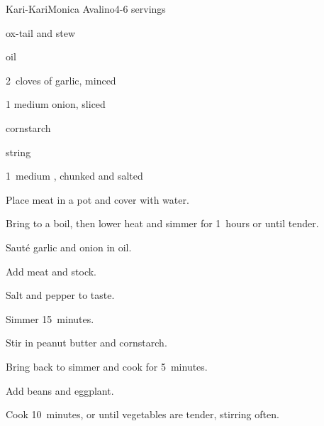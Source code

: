 \begin{recipe}{Kari-Kari}{Monica Avalino}{4-6 servings}

\begin{ingredients}
\item \lbs{2 \half} ox-tail and stew 
\item {} oil
\item 2~cloves of garlic, minced
\item 1 medium onion, sliced
\item {} 
\item {} cornstarch
\item \lbs{\half} string 
\item 1~medium , chunked and salted
\end{ingredients}

\begin{directions}
\item Place meat in a pot and cover with water.
\item Bring to a boil, then lower heat and simmer for 1\half~hours or until tender.
\item Saut\'e garlic and onion in oil.
\item Add meat and stock.
\item Salt and pepper to taste.
\item Simmer 15~minutes.
\item Stir in peanut butter and cornstarch.
\item Bring back to simmer and cook for 5~minutes.
\item Add beans and eggplant.
\item Cook 10~minutes, or until vegetables are tender, stirring often.
\end{directions}

\end{recipe}
